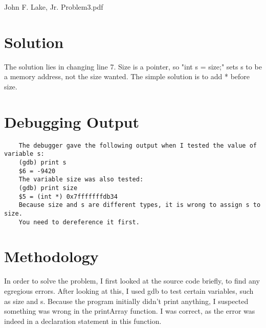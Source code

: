 \documentclass{article}
\begin{document}
John F. Lake, Jr. 
Problem3.pdf

\section{Solution}
	The solution lies in changing line 7.  Size is a pointer, so "int s = size;" sets s to be a memory address, not the size wanted.  The simple solution is to add * before size. 
\section{Debugging Output}
\begin{verbatim}
	The debugger gave the following output when I tested the value of variable s: 
	(gdb) print s
	$6 = -9420
	The variable size was also tested: 
	(gdb) print size
	$5 = (int *) 0x7fffffffdb34
	Because size and s are different types, it is wrong to assign s to size.
	You need to dereference it first.  
\end{verbatim}	
\section{Methodology}
	In order to solve the problem, I first looked at the source code briefly, to find any egregious errors.  After looking at this, I used gdb to test certain variables, such as size and s.  
	Because the program initially didn't print anything, I suspected something was wrong in the printArray function.  I was correct, as the error was indeed in a declaration statement in this
	function.
\end{document}
